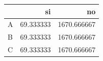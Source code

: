 \begin{tabular}{lrr}
\toprule
 & si & no \\
\midrule
A & 69.333333 & 1670.666667 \\
B & 69.333333 & 1670.666667 \\
C & 69.333333 & 1670.666667 \\
\bottomrule
\end{tabular}
